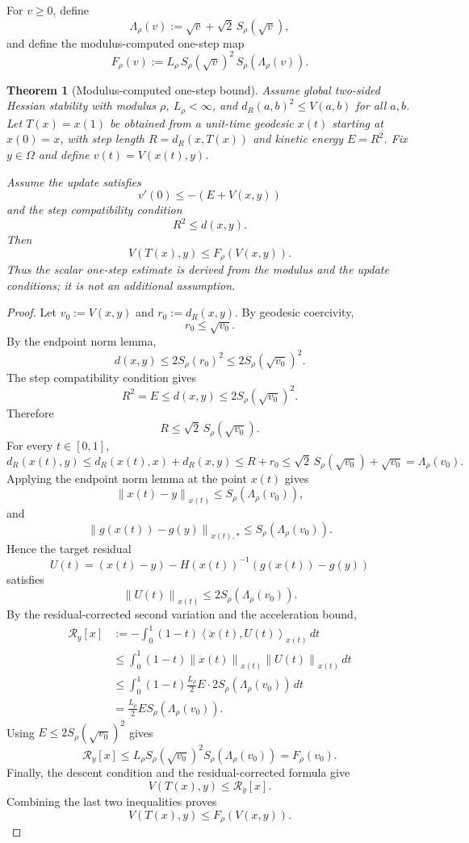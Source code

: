 \documentclass[11pt]{article}
\newtheorem{theorem}{Theorem}
\newcommand{\ip}[2]{\left\langle #1,#2\right\rangle}
\newcommand{\norm}[1]{\left\lVert #1\right\rVert}
\begin{document}
For $v\ge0$, define
\[
    \Lambda_\rho(v)
    :=
    \sqrt v + \sqrt{2}\,S_\rho(\sqrt v),
\]
and define the modulus-computed one-step map
\[
    F_\rho(v)
    :=
    L_\rho\,S_\rho(\sqrt v)^2\,S_\rho(\Lambda_\rho(v)).
\]

\begin{theorem}[Modulus-computed one-step bound]
Assume global two-sided Hessian stability with modulus $\rho$, $L_\rho<\infty$, and
$ d_R(a,b)^2\le V(a,b)$ for all $a,b$.  Let $T(x)=x(1)$ be obtained from a
unit-time geodesic $x(t)$ starting at $x(0)=x$, with step length
$R=d_R(x,T(x))$ and kinetic energy $E=R^2$.  Fix $y\in\Omega$ and define
$v(t)=V(x(t),y)$.

Assume the update satisfies
\[
    v'(0)\le -(E+V(x,y))
\]
and the step compatibility condition
\[
    R^2\le d(x,y).
\]
Then
\[
    V(T(x),y)
    \le
    F_\rho(V(x,y)).
\]
Thus the scalar one-step estimate is derived from the modulus and the update
conditions; it is not an additional assumption.
\end{theorem}

\begin{proof}
Let $v_0:=V(x,y)$ and $r_0:=d_R(x,y)$.  By geodesic coercivity,
\[
    r_0\le \sqrt{v_0}.
\]
By the endpoint norm lemma,
\[
    d(x,y)
    \le
    2S_\rho(r_0)^2
    \le
    2S_\rho(\sqrt{v_0})^2.
\]
The step compatibility condition gives
\[
    R^2=E\le d(x,y)
    \le
    2S_\rho(\sqrt{v_0})^2.
\]
Therefore
\[
    R\le \sqrt{2}\,S_\rho(\sqrt{v_0}).
\]
For every $t\in[0,1]$,
\[
    d_R(x(t),y)
    \le
    d_R(x(t),x)+d_R(x,y)
    \le
    R+r_0
    \le
    \sqrt{2}\,S_\rho(\sqrt{v_0})+\sqrt{v_0}
    =
    \Lambda_\rho(v_0).
\]
Applying the endpoint norm lemma at the point $x(t)$ gives
\[
    \norm{x(t)-y}_{x(t)}
    \le
    S_\rho(\Lambda_\rho(v_0)),
\]
and
\[
    \norm{g(x(t))-g(y)}_{x(t),*}
    \le
    S_\rho(\Lambda_\rho(v_0)).
\]
Hence the target residual
\[
    U(t)=(x(t)-y)-H(x(t))^{-1}(g(x(t))-g(y))
\]
satisfies
\[
    \norm{U(t)}_{x(t)}
    \le
    2S_\rho(\Lambda_\rho(v_0)).
\]
By the residual-corrected second variation and the acceleration bound,
\[
\begin{aligned}
    \mathcal R_y[x]
    &:=
    -\int_0^1(1-t)\ip{\ddot x(t)}{U(t)}_{x(t)}\,dt \\
    &\le
    \int_0^1(1-t)
    \norm{\ddot x(t)}_{x(t)}\norm{U(t)}_{x(t)}\,dt \\
    &\le
    \int_0^1(1-t)
    \frac{L_\rho}{2}E\cdot 2S_\rho(\Lambda_\rho(v_0))\,dt \\
    &=
    \frac{L_\rho}{2}E S_\rho(\Lambda_\rho(v_0)).
\end{aligned}
\]
Using $E\le 2S_\rho(\sqrt{v_0})^2$ gives
\[
    \mathcal R_y[x]
    \le
    L_\rho S_\rho(\sqrt{v_0})^2S_\rho(\Lambda_\rho(v_0))
    =
    F_\rho(v_0).
\]
Finally, the descent condition and the residual-corrected formula give
\[
    V(T(x),y)\le \mathcal R_y[x].
\]
Combining the last two inequalities proves
\[
    V(T(x),y)\le F_\rho(V(x,y)).
\]
\end{proof}
\end{document}
